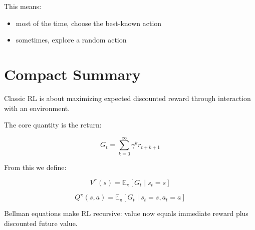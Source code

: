 \documentclass[11pt]{article}
\begin{document}
This means:
\begin{itemize}
    \item most of the time, choose the best-known action
    \item sometimes, explore a random action
\end{itemize}

\section{Compact Summary}

Classic RL is about maximizing expected discounted reward through interaction with an environment.

The core quantity is the return:

\[
G_t = \sum_{k=0}^{\infty} \gamma^k r_{t+k+1}
\]

From this we define:

\[
V^{\pi}(s) = \mathbb{E}_{\pi}[G_t \mid s_t = s]
\]

\[
Q^{\pi}(s,a) = \mathbb{E}_{\pi}[G_t \mid s_t = s, a_t = a]
\]

Bellman equations make RL recursive: value now equals immediate reward plus discounted future value.
\end{document}
